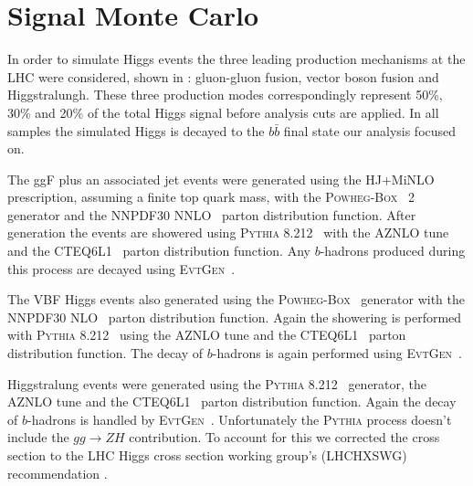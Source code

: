 \section{Signal Monte Carlo} \label{sec:data:signal_mc}

In order to simulate Higgs events the three leading production mechanisms at
the LHC were considered, shown in : gluon-gluon
fusion, vector boson fusion and Higgstralungh.  These three production modes
correspondingly represent 50\%, 30\% and 20\% of the total Higgs signal before
analysis cuts are applied.  In all samples the simulated Higgs is decayed to
the $b\bar{b}$ final state our analysis focused on.

The ggF plus an associated jet events were generated using the
HJ+MiNLO~\cite{Hamilton2015} prescription, assuming a finite top quark mass,
with the \textsc{Powheg-Box}~\cite{Campbell2012} 2 generator and the NNPDF30
NNLO~\cite{Hamilton:2012rf} parton distribution function.  After generation the
events are showered using \textsc{Pythia} 8.212~\cite{Sjostrand:2014zea} with
the AZNLO tune and the CTEQ6L1~\cite{Pumplin:2002vw} parton distribution
function. Any $b$-hadrons produced during this process are decayed using
\textsc{EvtGen}~\cite{LANGE2001152}.

The VBF Higgs events also generated using the
\textsc{Powheg-Box}~\cite{Nason:2009ai} generator with the NNPDF30
NLO~\cite{Hamilton:2012rf} parton distribution function. Again the showering is
performed with \textsc{Pythia} 8.212~\cite{Sjostrand:2014zea} using the AZNLO
tune and the CTEQ6L1~\cite{Pumplin:2002vw} parton distribution function.  The
decay of $b$-hadrons is again performed using
\textsc{EvtGen}~\cite{LANGE2001152}.

Higgstralung events were generated using the \textsc{Pythia}
8.212~\cite{Sjostrand:2014zea} generator, the AZNLO tune and the
CTEQ6L1~\cite{Pumplin:2002vw} parton distribution function.  Again the decay of
$b$-hadrons is handled by \textsc{EvtGen}~\cite{LANGE2001152}. Unfortunately
the \textsc{Pythia} process doesn't include the $gg \rightarrow ZH$
contribution.  To account for this we corrected the cross section to the LHC
Higgs cross section working group's (LHCHXSWG) recommendation
\cite{MelladoGarcia:2150771}.
